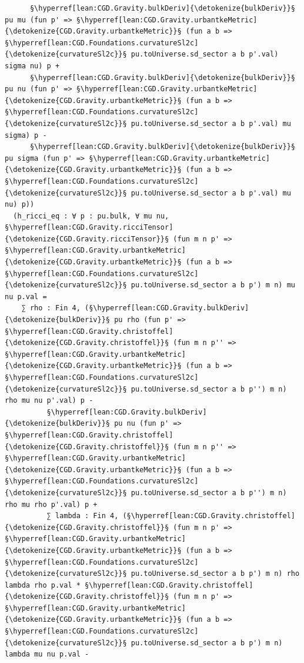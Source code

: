 \begin{verbatim}
      §\hyperref[lean:CGD.Gravity.bulkDeriv]{\detokenize{bulkDeriv}}§ pu mu (fun p' => §\hyperref[lean:CGD.Gravity.urbantkeMetric]{\detokenize{CGD.Gravity.urbantkeMetric}}§ (fun a b => §\hyperref[lean:CGD.Foundations.curvatureSl2c]{\detokenize{curvatureSl2c}}§ pu.toUniverse.sd_sector a b p'.val) sigma nu) p +
      §\hyperref[lean:CGD.Gravity.bulkDeriv]{\detokenize{bulkDeriv}}§ pu nu (fun p' => §\hyperref[lean:CGD.Gravity.urbantkeMetric]{\detokenize{CGD.Gravity.urbantkeMetric}}§ (fun a b => §\hyperref[lean:CGD.Foundations.curvatureSl2c]{\detokenize{curvatureSl2c}}§ pu.toUniverse.sd_sector a b p'.val) mu sigma) p -
      §\hyperref[lean:CGD.Gravity.bulkDeriv]{\detokenize{bulkDeriv}}§ pu sigma (fun p' => §\hyperref[lean:CGD.Gravity.urbantkeMetric]{\detokenize{CGD.Gravity.urbantkeMetric}}§ (fun a b => §\hyperref[lean:CGD.Foundations.curvatureSl2c]{\detokenize{curvatureSl2c}}§ pu.toUniverse.sd_sector a b p'.val) mu nu) p))
  (h_ricci_eq : ∀ p : pu.bulk, ∀ mu nu, §\hyperref[lean:CGD.Gravity.ricciTensor]{\detokenize{CGD.Gravity.ricciTensor}}§ (fun m n p' => §\hyperref[lean:CGD.Gravity.urbantkeMetric]{\detokenize{CGD.Gravity.urbantkeMetric}}§ (fun a b => §\hyperref[lean:CGD.Foundations.curvatureSl2c]{\detokenize{curvatureSl2c}}§ pu.toUniverse.sd_sector a b p') m n) mu nu p.val =
    ∑ rho : Fin 4, (§\hyperref[lean:CGD.Gravity.bulkDeriv]{\detokenize{bulkDeriv}}§ pu rho (fun p' => §\hyperref[lean:CGD.Gravity.christoffel]{\detokenize{CGD.Gravity.christoffel}}§ (fun m n p'' => §\hyperref[lean:CGD.Gravity.urbantkeMetric]{\detokenize{CGD.Gravity.urbantkeMetric}}§ (fun a b => §\hyperref[lean:CGD.Foundations.curvatureSl2c]{\detokenize{curvatureSl2c}}§ pu.toUniverse.sd_sector a b p'') m n) rho mu nu p'.val) p -
          §\hyperref[lean:CGD.Gravity.bulkDeriv]{\detokenize{bulkDeriv}}§ pu nu (fun p' => §\hyperref[lean:CGD.Gravity.christoffel]{\detokenize{CGD.Gravity.christoffel}}§ (fun m n p'' => §\hyperref[lean:CGD.Gravity.urbantkeMetric]{\detokenize{CGD.Gravity.urbantkeMetric}}§ (fun a b => §\hyperref[lean:CGD.Foundations.curvatureSl2c]{\detokenize{curvatureSl2c}}§ pu.toUniverse.sd_sector a b p'') m n) rho mu rho p'.val) p +
          ∑ lambda : Fin 4, (§\hyperref[lean:CGD.Gravity.christoffel]{\detokenize{CGD.Gravity.christoffel}}§ (fun m n p' => §\hyperref[lean:CGD.Gravity.urbantkeMetric]{\detokenize{CGD.Gravity.urbantkeMetric}}§ (fun a b => §\hyperref[lean:CGD.Foundations.curvatureSl2c]{\detokenize{curvatureSl2c}}§ pu.toUniverse.sd_sector a b p') m n) rho lambda rho p.val * §\hyperref[lean:CGD.Gravity.christoffel]{\detokenize{CGD.Gravity.christoffel}}§ (fun m n p' => §\hyperref[lean:CGD.Gravity.urbantkeMetric]{\detokenize{CGD.Gravity.urbantkeMetric}}§ (fun a b => §\hyperref[lean:CGD.Foundations.curvatureSl2c]{\detokenize{curvatureSl2c}}§ pu.toUniverse.sd_sector a b p') m n) lambda mu nu p.val -

\end{verbatim}
